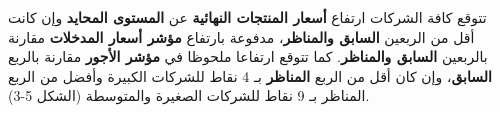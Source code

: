 تتوقع كافة الشركات ارتفاع \textbf{أسعار المنتجات النهائية} عن \textbf{المستوى المحايد} وإن كانت أقل من الربعين \textbf{السابق والمناظر}، مدفوعة بارتفاع \textbf{مؤشر أسعار المدخلات} مقارنة بالربعين \textbf{السابق والمناظر}. كما تتوقع ارتفاعا ملحوظا في \textbf{مؤشر الأجور} مقارنة بالربع \textbf{السابق}، وإن كان أقل من الربع \textbf{المناظر} بـ 4 نقاط للشركات الكبيرة وأفضل من الربع المناظر بـ 9 نقاط للشركات الصغيرة والمتوسطة (الشكل 5-3).
